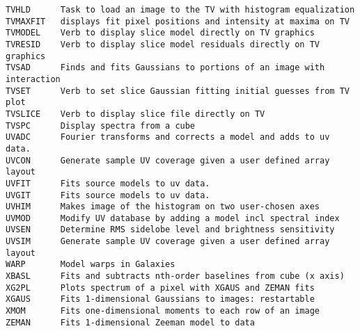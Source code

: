 \begin{verbatim}
TVHLD      Task to load an image to the TV with histogram equalization
TVMAXFIT   displays fit pixel positions and intensity at maxima on TV
TVMODEL    Verb to display slice model directly on TV graphics
TVRESID    Verb to display slice model residuals directly on TV graphics
TVSAD      Finds and fits Gaussians to portions of an image with interaction
TVSET      Verb to set slice Gaussian fitting initial guesses from TV plot
TVSLICE    Verb to display slice file directly on TV
TVSPC      Display spectra from a cube
UVADC      Fourier transforms and corrects a model and adds to uv data.
UVCON      Generate sample UV coverage given a user defined array layout
UVFIT      Fits source models to uv data.
UVGIT      Fits source models to uv data.
UVHIM      Makes image of the histogram on two user-chosen axes
UVMOD      Modify UV database by adding a model incl spectral index
UVSEN      Determine RMS sidelobe level and brightness sensitivity
UVSIM      Generate sample UV coverage given a user defined array layout
WARP       Model warps in Galaxies
XBASL      Fits and subtracts nth-order baselines from cube (x axis)
XG2PL      Plots spectrum of a pixel with XGAUS and ZEMAN fits
XGAUS      Fits 1-dimensional Gaussians to images: restartable
XMOM       Fits one-dimensional moments to each row of an image
ZEMAN      Fits 1-dimensional Zeeman model to data
\end{verbatim}\eve


